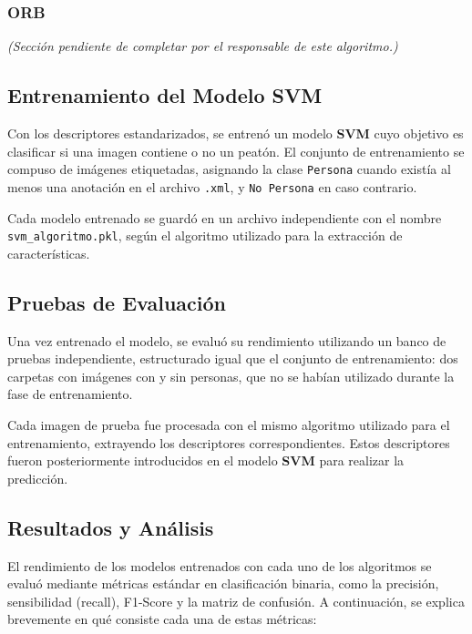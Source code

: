 \documentclass[a4paper]{article}
\begin{document}
\subsubsection*{ORB}

\textit{(Sección pendiente de completar por el responsable de este algoritmo.)}



\subsection{Entrenamiento del Modelo SVM}

Con los descriptores estandarizados, se entrenó un modelo \textbf{SVM} cuyo objetivo es clasificar si una imagen contiene o no un peatón. El conjunto de entrenamiento se compuso de imágenes etiquetadas, asignando la clase \texttt{Persona} cuando existía al menos una anotación en el archivo \texttt{.xml}, y \texttt{No Persona} en caso contrario.

\par\vspace{0.5cm}

Cada modelo entrenado se guardó en un archivo independiente con el nombre \texttt{svm\_algoritmo.pkl}, según el algoritmo utilizado para la extracción de características.

\subsection{Pruebas de Evaluación}

Una vez entrenado el modelo, se evaluó su rendimiento utilizando un banco de pruebas independiente, estructurado igual que el conjunto de entrenamiento: dos carpetas con imágenes con y sin personas, que no se habían utilizado durante la fase de entrenamiento.
\par\vspace{0.5cm}

Cada imagen de prueba fue procesada con el mismo algoritmo utilizado para el entrenamiento, extrayendo los descriptores correspondientes. Estos descriptores fueron posteriormente introducidos en el modelo \textbf{SVM} para realizar la predicción.

\subsection{Resultados y Análisis}

El rendimiento de los modelos entrenados con cada uno de los algoritmos se evaluó mediante métricas estándar en clasificación binaria, como la precisión, sensibilidad (recall), F1-Score y la matriz de confusión. A continuación, se explica brevemente en qué consiste cada una de estas métricas:
\end{document}
